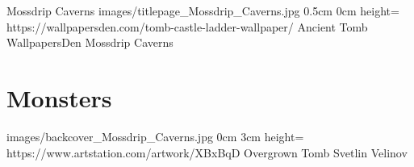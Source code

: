 \documentclass[letterpaper,openany,twoside,twocolumn]{book}
\begin{document}
	\regionTitlePage
		{Mossdrip Caverns}
		{images/titlepage_Mossdrip_Caverns.jpg}
		{0.5cm}
		{0cm}
		{height=\paperheight}
		{https://wallpapersden.com/tomb-castle-ladder-wallpaper/}
		{Ancient Tomb}
		{WallpapersDen}
		{Mossdrip Caverns}
	
	\tableofcontents
	
	\mainmatter
	
	\MonsterSheetGeometry
	\part{Monsters}
	
	
	\regionLastPage
		{images/backcover_Mossdrip_Caverns.jpg}
		{0cm}
		{3cm}
		{height=\paperheight}
		{https://www.artstation.com/artwork/XBxBqD}
		{Overgrown Tomb}
		{Svetlin Velinov}
		{}
\end{document}
